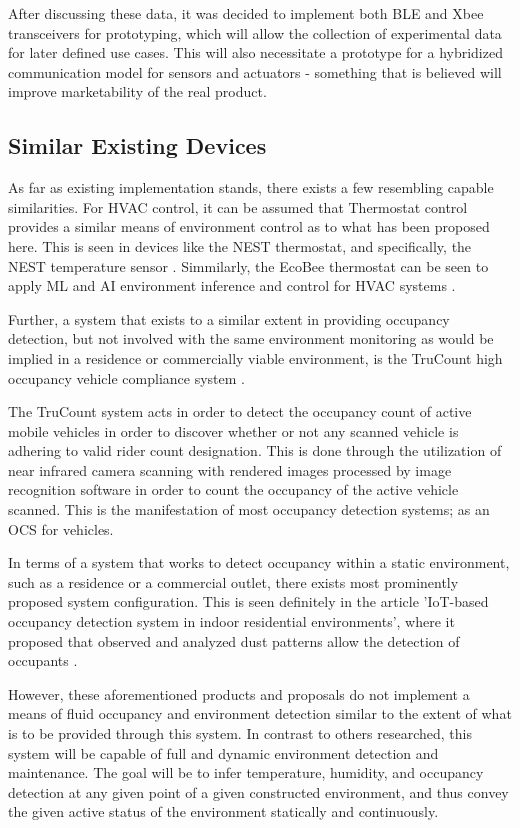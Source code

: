 \documentclass{article}
\begin{document}
After discussing these data, it was decided to implement both BLE and Xbee transceivers for prototyping, which will allow the collection of experimental data for later defined use cases. This will also necessitate a prototype for a hybridized communication model for sensors and actuators - something that is believed will improve marketability of the real product.

\subsection{Similar Existing Devices}

As far as existing implementation stands, there exists a few resembling capable similarities. For HVAC control, it can be assumed that Thermostat control provides a similar means of environment control as to what has been proposed here. This is seen in devices like the NEST thermostat, and specifically, the NEST temperature sensor \cite{r16}. Simmilarly, the EcoBee thermostat can be seen to apply \gls{ML} and \gls{AI} environment inference and control for \gls{HVAC} systems \cite{r17}. 

Further, a system that exists to a similar extent in providing occupancy detection, but not involved with the same environment monitoring as would be implied in a residence or commercially viable environment, is the TruCount high occupancy vehicle compliance system \cite{r14}. 

The TruCount system acts in order to detect the occupancy count of active mobile vehicles in order to discover whether or not any scanned vehicle is adhering to valid rider count designation. This is done through the utilization of near infrared camera scanning with rendered images processed by image recognition software in order to count the occupancy of the active vehicle scanned. This is the manifestation of most occupancy detection systems; as an \gls{OCS} for vehicles.

In terms of a system that works to detect occupancy within a static environment, such as a residence or a commercial outlet, there exists most prominently proposed system configuration. This is seen definitely in the article 'IoT-based occupancy detection system in indoor residential environments', where it proposed that observed and analyzed dust patterns allow the detection of occupants \cite{r15}.  

However, these aforementioned products and proposals do not implement a means of fluid occupancy and environment detection similar to the extent of what is to be provided through this system. In contrast to others researched, this system will be capable of full and dynamic environment detection and maintenance. The goal will be to infer temperature, humidity, and occupancy detection at any given point of a given constructed environment, and thus convey the given active status of the environment statically and continuously. 
\end{document}
